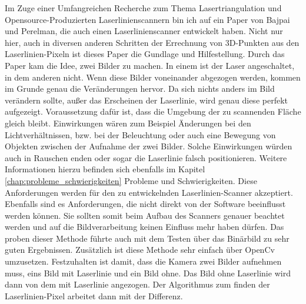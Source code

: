 		Im Zuge einer Umfangreichen Recherche zum Thema Lasertriangulation und Opensource-Produzierten Laserlinienscannern bin ich auf ein Paper von Bajpai und Perelman, die auch einen Laserlinienscanner entwickelt haben. Nicht nur hier, auch in diversen anderen Schritten der Errechnung von 3D-Punkten aus den Laserlinien-Pixeln ist dieses Paper die Gundlage und Hilfestellung. Durch das Paper kam die Idee, zwei Bilder zu machen. In einem ist der Laser angeschaltet, in dem anderen nicht. Wenn diese Bilder voneinander abgezogen werden, kommen im Grunde genau die Veränderungen hervor. Da sich nichts anders im Bild verändern sollte, außer das Erscheinen der Laserlinie, wird genau diese perfekt aufgezeigt. Voraussetzung dafür ist, dass die Umgebung der zu scannenden Fläche gleich bleibt. Einwirkungen wären zum Beispiel Änderungen bei den Lichtverhältnissen, bzw. bei der Beleuchtung oder auch eine Bewegung von Objekten zwischen der Aufnahme der zwei Bilder. Solche Einwirkungen würden auch in Rauschen enden oder sogar die Laserlinie falsch positionieren. Weitere Informationen hierzu befinden sich ebenfalls im Kapitel \ref{chap:probleme_schwierigkeiten} Probleme und Schwierigkeiten. Diese Anforderungen werden für den zu entwickelnden Laserlinien-Scanner akzeptiert. Ebenfalls sind es Anforderungen, die nicht direkt von der Software beeinflusst werden können. Sie sollten somit beim Aufbau des Scanners genauer beachtet werden und auf die Bildverarbeitung keinen Einfluss mehr haben dürfen. Das proben dieser Methode führte auch mit dem Testen über das Binärbild zu sehr guten Ergebnissen. Zusätzlich ist diese Methode sehr einfach über OpenCv umzusetzen. Festzuhalten ist damit, dass die Kamera zwei Bilder aufnehmen muss, eins Bild mit Laserlinie und ein Bild ohne. Das Bild ohne Laserlinie wird dann von dem mit Laserlinie angezogen. Der Algorithmus zum finden der Laserlinien-Pixel arbeitet dann mit der Differenz.
		
